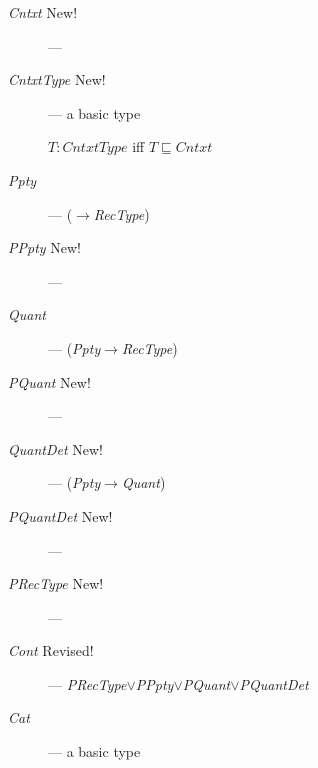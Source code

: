 \begin{description}
\item[\textnormal{\textit{Cntxt}} New!] --- 

    
  \item[\textnormal{\textit{CntxtType}} New!] --- a basic type

    $T:\textit{CntxtType}$ iff $T\sqsubseteq\textit{Cntxt}$
    
      \item[\textnormal{\textit{Ppty}}] ---
        ($\rightarrow$\textit{RecType})
        
      \item[\textnormal{\textit{PPpty}} New!] --- 
        
      \item[\textnormal{\textit{Quant}}] ---
        (\textit{Ppty}$\rightarrow$\textit{RecType})
        
      \item[\textnormal{\textit{PQuant}} New!] --- 
        
      \item[\textnormal{\textit{QuantDet}} New!] ---
        (\textit{Ppty}$\rightarrow$\textit{Quant})
        
      \item[\textnormal{\textit{PQuantDet}} New!] ---
        
      \item[\textnormal{\textit{PRecType}} New!] ---
          

    \item[\textnormal{\textit{Cont}} Revised!] --- \textit{PRecType}$\vee$\textit{PPpty}$\vee$\textit{PQuant}$\vee$\textit{PQuantDet}

      
    \item[\textnormal{\textit{Cat}}] --- a basic type


\end{description}
